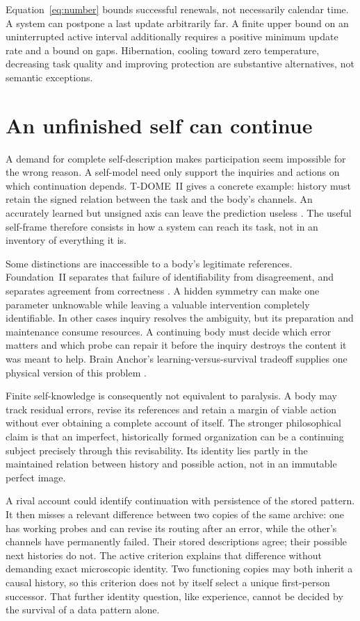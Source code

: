 \documentclass[12pt,a4paper]{article}
\begin{document}
Equation~\eqref{eq:number} bounds successful renewals, not necessarily calendar time. A system can postpone a last update arbitrarily far. A finite upper bound on an uninterrupted active interval additionally requires a positive minimum update rate and a bound on gaps. Hibernation, cooling toward zero temperature, decreasing task quality and improving protection are substantive alternatives, not semantic exceptions.

\section{An unfinished self can continue}

A demand for complete self-description makes participation seem impossible for the wrong reason. A self-model need only support the inquiries and actions on which continuation depends. T-DOME~II gives a concrete example: history must retain the signed relation between the task and the body's channels. An accurately learned but unsigned axis can leave the prediction useless \cite{TD}. The useful self-frame therefore consists in how a system can reach its task, not in an inventory of everything it is.

Some distinctions are inaccessible to a body's legitimate references. Foundation~II separates that failure of identifiability from disagreement, and separates agreement from correctness \cite{Foundation}. A hidden symmetry can make one parameter unknowable while leaving a valuable intervention completely identifiable. In other cases inquiry resolves the ambiguity, but its preparation and maintenance consume resources. A continuing body must decide which error matters and which probe can repair it before the inquiry destroys the content it was meant to help. Brain Anchor's learning-versus-survival tradeoff supplies one physical version of this problem \cite{Brain}.

Finite self-knowledge is consequently not equivalent to paralysis. A body may track residual errors, revise its references and retain a margin of viable action without ever obtaining a complete account of itself. The stronger philosophical claim is that an imperfect, historically formed organization can be a continuing subject precisely through this revisability. Its identity lies partly in the maintained relation between history and possible action, not in an immutable perfect image.

A rival account could identify continuation with persistence of the stored pattern. It then misses a relevant difference between two copies of the same archive: one has working probes and can revise its routing after an error, while the other's channels have permanently failed. Their stored descriptions agree; their possible next histories do not. The active criterion explains that difference without demanding exact microscopic identity. Two functioning copies may both inherit a causal history, so this criterion does not by itself select a unique first-person successor. That further identity question, like experience, cannot be decided by the survival of a data pattern alone.
\end{document}
